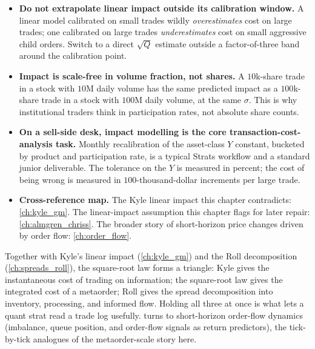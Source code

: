 \begin{itemize}
  \item \textbf{Do not extrapolate linear impact outside its
  calibration window.} A linear model calibrated on small trades
  wildly \emph{overestimates} cost on large trades; one calibrated
  on large trades \emph{underestimates} cost on small aggressive
  child orders. Switch to a direct $\sqrt{Q}$ estimate outside a
  factor-of-three band around the calibration point.
  \item \textbf{Impact is scale-free in volume fraction, not shares.}
  A $10$k-share trade in a stock with $10$M daily volume has the
  same predicted impact as a $100$k-share trade in a stock with
  $100$M daily volume, at the same $\sigma$. This is why
  institutional traders think in participation rates, not absolute
  share counts.
  \item \textbf{On a sell-side desk, impact modelling is the
  core transaction-cost-analysis task.} Monthly recalibration of
  the asset-class $Y$ constant, bucketed by product and
  participation rate, is a typical Strats workflow and a standard
  junior deliverable. The tolerance on the $Y$ is measured in
  percent; the cost of being wrong is measured in $100$-thousand-dollar
  increments per large trade.
  \item \textbf{Cross-reference map.} The Kyle linear impact this
  chapter contradicts: \cref{ch:kyle_gm}. The linear-impact
  assumption this chapter flags for later repair:
  \cref{ch:almgren_chriss}. The broader story of short-horizon
  price changes driven by order flow: \cref{ch:order_flow}.
\end{itemize}

\bigskip

Together with Kyle's linear impact (\cref{ch:kyle_gm}) and the Roll
decomposition (\cref{ch:spreads_roll}), the square-root law forms a
triangle: Kyle gives the instantaneous cost of trading on
information; the square-root law gives the integrated cost of a
metaorder; Roll gives the spread decomposition into inventory,
processing, and informed flow. Holding all three at once is what
lets a quant strat read a trade log usefully. 
turns to short-horizon order-flow dynamics (imbalance, queue
position, and order-flow signals as return predictors), the
tick-by-tick analogues of the metaorder-scale story here.
